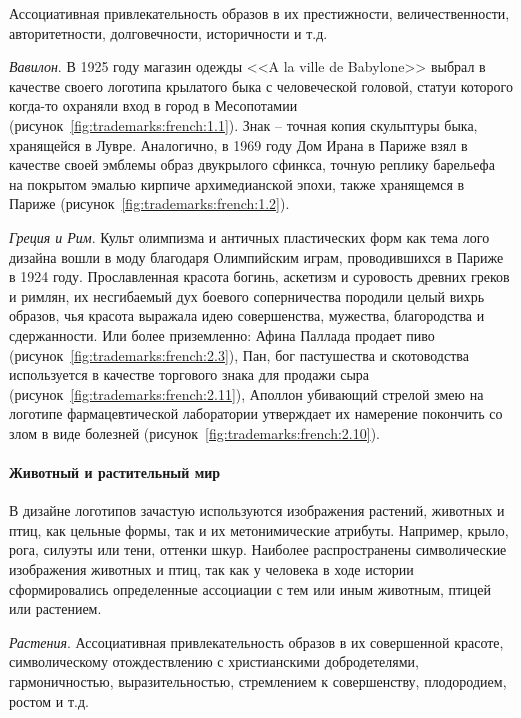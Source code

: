 Ассоциативная привлекательность образов в их престижности, величественности,
авторитетности, долговечности, историчности и т.д.

\emph{Вавилон}. В 1925 году магазин одежды <<A la ville de Babylone>> выбрал в качестве своего логотипа крылатого быка с человеческой головой, статуи которого когда-то охраняли вход в город в
  Месопотамии (рисунок~\ref{fig:trademarks:french:1.1}).  Знак -- точная копия скульптуры быка, хранящейся в
  Лувре. Аналогично, в 1969 году Дом Ирана в Париже взял в качестве своей эмблемы образ двукрылого
  сфинкса, точную реплику барельефа на покрытом эмалью кирпиче архимедианской эпохи, также хранящемся
  в Париже (рисунок~\ref{fig:trademarks:french:1.2}).

\emph{Греция и Рим}. Культ олимпизма и античных пластических форм как тема лого дизайна вошли в моду
  благодаря Олимпийским играм, проводившихся в Париже в 1924 году. Прославленная красота богинь,
  аскетизм и суровость древних греков и римлян, их несгибаемый дух боевого соперничества породили
  целый вихрь образов, чья красота выражала идею совершенства, мужества, благородства и
  сдержанности. Или более приземленно: Афина Паллада продает пиво (рисунок~\ref{fig:trademarks:french:2.3}),
  Пан, бог пастушества и скотоводства используется в качестве торгового знака для продажи сыра
  (рисунок~\ref{fig:trademarks:french:2.11}), Аполлон убивающий стрелой
  змею на логотипе фармацевтической лаборатории утверждает их намерение покончить со злом в виде
  болезней (рисунок~\ref{fig:trademarks:french:2.10}).

\paragraph{Животный и растительный мир}

В дизайне логотипов зачастую используются изображения растений, животных и птиц,
как цельные формы, так и их метонимические атрибуты. Например, крыло, рога,
силуэты или тени, оттенки шкур. Наиболее распространены символические изображения
животных и птиц, так как у человека в ходе истории сформировались определенные
ассоциации с тем или иным животным, птицей или растением.

\emph{Растения}. Ассоциативная привлекательность образов в их совершенной
  красоте, символическому отождествлению с христианскими добродетелями,
  гармоничностью, выразительностью, стремлением к совершенству, плодородием,
  ростом и т.д.

